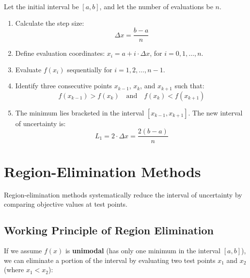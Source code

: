 \documentclass[12pt,a4paper]{article}
\begin{document}
\begin{tcolorbox}[formulabox, title={Exhaustive Search Algorithm}]
Let the initial interval be $[a, b]$, and let the number of evaluations be $n$.
\begin{enumerate}[label=\textbf{\arabic*.}, leftmargin=*, itemsep=2pt, topsep=0pt]
  \item Calculate the step size:
    \begin{equation}
      \Delta x = \frac{b - a}{n}
    \end{equation}
  \item Define evaluation coordinates: $x_i = a + i \cdot \Delta x$, for $i = 0, 1, \dots, n$.
  \item Evaluate $f(x_i)$ sequentially for $i = 1, 2, \dots, n-1$.
  \item Identify three consecutive points $x_{k-1}$, $x_k$, and $x_{k+1}$ such that:
    \begin{equation}
      f(x_{k-1}) > f(x_k) \quad \text{and} \quad f(x_k) < f(x_{k+1})
    \end{equation}
  \item The minimum lies bracketed in the interval $[x_{k-1}, x_{k+1}]$. The new interval of uncertainty is:
    \begin{equation}
      L_1 = 2 \cdot \Delta x = \frac{2(b - a)}{n}
    \end{equation}
\end{enumerate}
\end{tcolorbox}

\section{Region-Elimination Methods}

Region-elimination methods systematically reduce the interval of uncertainty by comparing objective values at test points.

\subsection{Working Principle of Region Elimination}
If we assume $f(x)$ is \textbf{unimodal} (has only one minimum in the interval $[a, b]$), we can eliminate a portion of the interval by evaluating two test points $x_1$ and $x_2$ (where $x_1 < x_2$):
\end{document}
